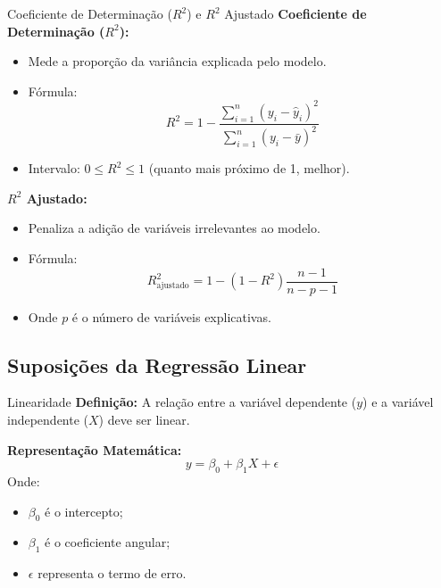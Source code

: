 \documentclass[]{beamer}
\begin{document}
\begin{frame}{Coeficiente de Determinação ($R^2$) e $R^2$ Ajustado}
    \textbf{Coeficiente de Determinação ($R^2$):}
    \begin{itemize}
        \item Mede a proporção da variância explicada pelo modelo.
        \item Fórmula:
        \begin{equation}
            R^2 = 1 - \frac{\sum_{i=1}^{n} (y_i - \hat{y}_i)^2}{\sum_{i=1}^{n} (y_i - \bar{y})^2}
        \end{equation}
        \item Intervalo: $0 \leq R^2 \leq 1$ (quanto mais próximo de 1, melhor).
    \end{itemize}

    \textbf{$R^2$ Ajustado:}
    \begin{itemize}
        \item Penaliza a adição de variáveis irrelevantes ao modelo.
        \item Fórmula:
        \begin{equation}
            R^2_{\text{ajustado}} = 1 - \left(1 - R^2\right) \frac{n - 1}{n - p - 1}
        \end{equation}
        \item Onde $p$ é o número de variáveis explicativas.
    \end{itemize}
\end{frame}


\subsection{Suposições da Regressão Linear}

\begin{frame}{Linearidade}
    \textbf{Definição:}
    A relação entre a variável dependente ($y$) e a variável independente ($X$) deve ser linear.

    \vspace{0.5cm}
    \textbf{Representação Matemática:}
    \begin{equation}
        y = \beta_0 + \beta_1X + \epsilon
    \end{equation}
    Onde:
    \begin{itemize}
        \item $\beta_0$ é o intercepto;
        \item $\beta_1$ é o coeficiente angular;
        \item $\epsilon$ representa o termo de erro.
    \end{itemize}

    \hspace{3cm}
\end{frame}
\end{document}
